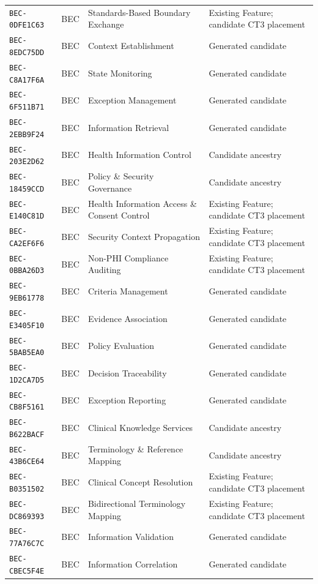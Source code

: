 \documentclass[11pt,a4paper,openany]{book}
\begin{document}
\begin{longtable}{@{}p{.19\linewidth}p{.12\linewidth}p{.39\linewidth}p{.24\linewidth}@{}}
\texttt{BEC-0DFE1C63} & BEC & Standards-Based Boundary Exchange & Existing Feature; candidate CT3 placement \\
\texttt{BEC-8EDC75DD} & BEC & Context Establishment & Generated candidate \\
\texttt{BEC-C8A17F6A} & BEC & State Monitoring & Generated candidate \\
\texttt{BEC-6F511B71} & BEC & Exception Management & Generated candidate \\
\texttt{BEC-2EBB9F24} & BEC & Information Retrieval & Generated candidate \\
\texttt{BEC-203E2D62} & BEC & Health Information Control & Candidate ancestry \\
\texttt{BEC-18459CCD} & BEC & Policy \& Security Governance & Candidate ancestry \\
\texttt{BEC-E140C81D} & BEC & Health Information Access \& Consent Control & Existing Feature; candidate CT3 placement \\
\texttt{BEC-CA2EF6F6} & BEC & Security Context Propagation & Existing Feature; candidate CT3 placement \\
\texttt{BEC-0BBA26D3} & BEC & Non-PHI Compliance Auditing & Existing Feature; candidate CT3 placement \\
\texttt{BEC-9EB61778} & BEC & Criteria Management & Generated candidate \\
\texttt{BEC-E3405F10} & BEC & Evidence Association & Generated candidate \\
\texttt{BEC-5BAB5EA0} & BEC & Policy Evaluation & Generated candidate \\
\texttt{BEC-1D2CA7D5} & BEC & Decision Traceability & Generated candidate \\
\texttt{BEC-CB8F5161} & BEC & Exception Reporting & Generated candidate \\
\texttt{BEC-B622BACF} & BEC & Clinical Knowledge Services & Candidate ancestry \\
\texttt{BEC-43B6CE64} & BEC & Terminology \& Reference Mapping & Candidate ancestry \\
\texttt{BEC-B0351502} & BEC & Clinical Concept Resolution & Existing Feature; candidate CT3 placement \\
\texttt{BEC-DC869393} & BEC & Bidirectional Terminology Mapping & Existing Feature; candidate CT3 placement \\
\texttt{BEC-77A76C7C} & BEC & Information Validation & Generated candidate \\
\texttt{BEC-CBEC5F4E} & BEC & Information Correlation & Generated candidate \\

\end{longtable}
\end{document}
